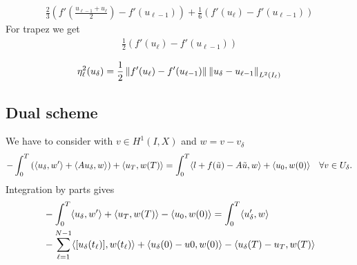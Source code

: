 \documentclass[english,12pt,a4paper]{article}
\begin{document}
%
\begin{align*}
\frac23\left( f'(\frac{u_{\ell-1} + u_{\ell}}{2})- f'(u_{\ell-1})\right) + \frac16\left( f'(u_{\ell})- f'(u_{\ell-1})\right)
\end{align*}
%
For trapez we get
%
\begin{align*}
\frac12\left( f'(u_{\ell})- f'(u_{\ell-1})\right)
\end{align*}
%
%
\begin{lemma}\label{lemma:}

%
\begin{equation}\label{eq:}
\eta^2_{\ell}(u_{\delta}) = \frac12\left\|f'(u_{\ell})- f'(u_{\ell-1})\right\|\left\|u_\delta - u_{\ell-1}\right\|_{L^2(I_{\ell})}
\end{equation}
% 
\end{lemma}
%
%
\subsection{Dual scheme}\label{subsec:}
%
We have to consider with $v\in H^1(I,X)$ and $w=v-v_{\delta}$
%
\begin{align*}
-\int_0^T \left(\langle u_{\delta},w'\rangle+ \langle A u_{\delta},w\rangle\right)+ \langle u_T,w(T)\rangle = \int_0^T \langle l+f(\tilde u) - A \tilde u,w\rangle + \langle u_0,w(0)\rangle \quad\forall v\in U_{\delta}.
\end{align*}
%
Integration by parts gives
%
\begin{align*}
&-\int_0^T \langle u_{\delta},w'\rangle + \langle u_T,w(T)\rangle - \langle u_0,w(0)\rangle= \int_0^T \langle u_{\delta}',w\rangle \\
&- \sum_{\ell=1}^{N-1} \langle[u_{\delta}(t_{\ell})],w(t_{\ell})\rangle + \langle u_{\delta}(0)-u0,w(0)\rangle - \langle u_{\delta}(T)-u_T,w(T)\rangle
\end{align*}
%



%
\end{document}
